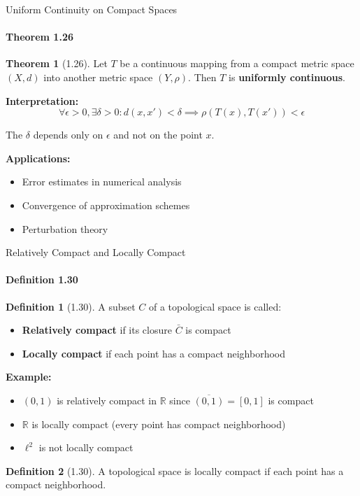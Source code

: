 \documentclass[aspectratio=169,10pt]{beamer}
\theoremstyle{definition}
\newtheorem{defn}{Definition}
\newtheorem{thm}{Theorem}
\begin{document}
\begin{frame}{Uniform Continuity on Compact Spaces}
\framesubtitle{Theorem 1.26}

\begin{thm}[1.26]
Let $T$ be a continuous mapping from a compact metric space $(X, d)$ into another metric space $(Y, \rho)$. Then $T$ is \textbf{uniformly continuous}.
\end{thm}

\vspace{0.4cm}

\textbf{Interpretation:}
\begin{equation*}
\forall \epsilon > 0, \exists \delta > 0 : d(x, x') < \delta \implies \rho(T(x), T(x')) < \epsilon
\end{equation*}

\vspace{0.3cm}

The $\delta$ depends only on $\epsilon$ and not on the point $x$.

\vspace{0.3cm}

\textbf{Applications:}
\begin{itemize}
    \item Error estimates in numerical analysis
    \item Convergence of approximation schemes
    \item Perturbation theory
\end{itemize}
\end{frame}

\begin{frame}{Relatively Compact and Locally Compact}
\framesubtitle{Definition 1.30}

\begin{defn}[1.30]
A subset $C$ of a topological space is called:
\begin{itemize}
    \item \textbf{Relatively compact} if its closure $\bar{C}$ is compact
    \item \textbf{Locally compact} if each point has a compact neighborhood
\end{itemize}
\end{defn}

\vspace{0.3cm}

\textbf{Example:}
\begin{itemize}
    \item $(0, 1)$ is relatively compact in $\mathbb{R}$ since $\overline{(0,1)} = [0,1]$ is compact
    \item $\mathbb{R}$ is locally compact (every point has compact neighborhood)
    \item $\ell^2$ is not locally compact
\end{itemize}

\vspace{0.3cm}

\begin{defn}[1.30]
A topological space is locally compact if each point has a compact neighborhood.
\end{defn}
\end{frame}
\end{document}
